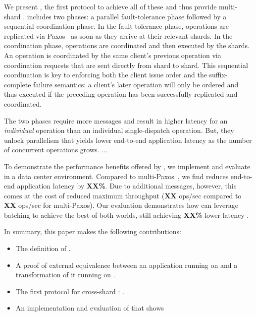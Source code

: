 We present \sys{}, the first protocol to achieve all of these and thus
provide multi-shard \mdl{}.
\sys{} includes two phases: a parallel fault-tolerance phase followed by a sequential coordination phase.
In the fault tolerance phase, operations are replicated via Paxos~\cite{lamport1998paxos} as soon as they arrive at their relevant shards.
In the coordination phase, operations are coordinated and then executed by the shards. An operation is coordinated by the same client's previous operation via coordination requests that are sent directly from shard to shard.
This sequential coordination is key to enforcing both the client issue order and the suffix-complete failure semantics:
a client's later operation will only be ordered and thus executed if the preceding operation has been successfully replicated and coordinated.

The two phases require more messages and result in higher latency for an \textit{individual} operation than an individual single-dispatch operation.
But, they unlock parallelism that yields lower end-to-end application latency as the number of concurrent operations grows.
...

%



To demonstrate the performance benefits offered by \MDL{},
we implement and evaluate \sys{} in a data center environment.
Compared to multi-Paxos~\cite{lamport1998paxos}, we find \sys{}
reduces end-to-end application latency by \textbf{XX\%}. Due to
additional messages, however, this comes at the cost of reduced
maximum throughput (\textbf{XX} ops/sec compared to \textbf{XX}
ops/sec for multi-Paxos). Our evaluation demonstrates how \sys{} can leverage
batching to achieve the best of both worlds, still achieving
\textbf{XX\%} lower latency .

In summary, this paper makes the following contributions:
\begin{itemize}[leftmargin=*]
\item The definition of \mdllong{}.
\item A proof of external equivalence between an application running on \sdl{} and a transformation of it running on \mdl{}.
\item The first protocol for cross-shard \mdl{}: \sys{}.
\item An implementation and evaluation of \sys{} that shows 
\end{itemize}

